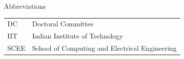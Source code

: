 \begin{frontchapter}{Abbreviations}
\begin{tabular}{@{}ll@{}}
  DC   & Doctoral Committee \\
  IIT  & Indian Institute of Technology \\
  SCEE & School of Computing and Electrical Engineering \\
\end{tabular}
\end{frontchapter}
